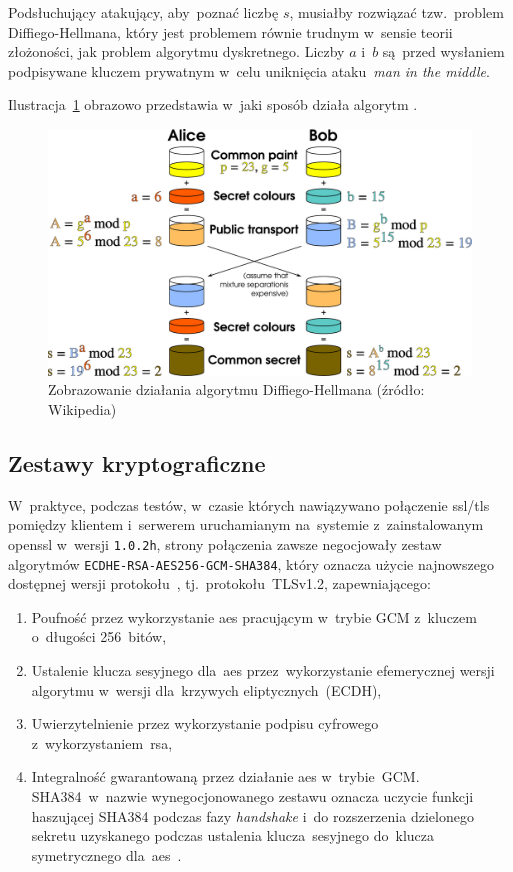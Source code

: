 \documentclass[thesis]{subfiles}
\begin{document}
Podsłuchujący atakujący, aby~poznać liczbę $s$, musiałby rozwiązać tzw.~problem Diffiego-Hellmana, który jest problemem równie trudnym w~sensie teorii złożoności, jak problem algorytmu dyskretnego. Liczby $a$ i~$b$ są~przed wysłaniem podpisywane kluczem prywatnym w~celu uniknięcia ataku~\emph{man in the middle}.

Ilustracja~\ref{fig:dh} obrazowo przedstawia w~jaki sposób działa algorytm .

\begin{figure}
	\centering
	\includegraphics[width=\textwidth]{img/Diffie-Hellman_Key_Exchange_desc}
	\caption{Zobrazowanie działania algorytmu Diffiego-Hellmana (źródło: Wikipedia)}
	\label{fig:dh}
\end{figure}


\subsection{Zestawy kryptograficzne}

W~praktyce, podczas testów, w~czasie których nawiązywano połączenie \gls{ssl/tls} pomiędzy klientem i~serwerem uruchamianym na~systemie z~zainstalowanym \gls{openssl} w~wersji \texttt{1.0.2h}, strony połączenia zawsze negocjowały zestaw algorytmów \texttt{ECDHE-RSA-AES256-GCM-SHA384}, który oznacza użycie najnowszego dostępnej wersji protokołu~, tj.~protokołu~TLSv1.2, zapewniającego:
\begin{enumerate}
\item Poufność przez wykorzystanie \gls{aes} pracującym w~trybie GCM z~kluczem o~długości 256~bitów,
\item Ustalenie klucza sesyjnego dla~\gls{aes} przez~wykorzystanie efemerycznej wersji algorytmu  w~wersji dla~krzywych eliptycznych~(ECDH),
\item Uwierzytelnienie przez wykorzystanie podpisu cyfrowego z~wykorzystaniem~\gls{rsa},
\item Integralność gwarantowaną przez działanie \gls{aes} w~trybie~GCM. SHA384~w~nazwie wynegocjonowanego zestawu oznacza uczycie funkcji haszującej SHA384 podczas fazy \emph{handshake} i~do rozszerzenia dzielonego sekretu uzyskanego podczas ustalenia klucza~sesyjnego do~klucza symetrycznego dla~\gls{aes}~\cite{stack:openssl-sha-gcm}.
\end{enumerate}
\end{document}
